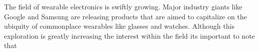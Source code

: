 

The field of wearable electronics is swiftly growing. Major industry giants like Google and Samsung are releasing products that are aimed to capitalize on the ubiquity of commonplace wearables like glasses and watches. Although this exploration is greatly increasing the interest within the field its important to note that 